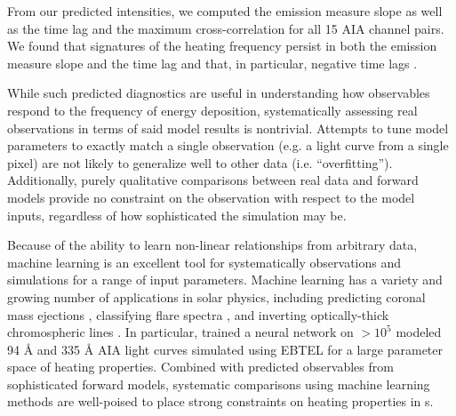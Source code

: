 From our predicted intensities, we computed the emission measure slope as well as the time lag and the maximum cross-correlation for all 15 AIA channel pairs.
We found that signatures of the heating frequency persist in both the emission measure slope and the time lag and that, in particular, negative time lags .

While such predicted diagnostics are useful in understanding how observables respond to the frequency of energy deposition, systematically assessing real observations in terms of said model results is nontrivial.
Attempts to tune model parameters to exactly match a single observation (e.g. a light curve from a single pixel) are not likely to generalize well to other data (i.e. ``overfitting'').
Additionally, purely qualitative comparisons between real data and forward models provide no constraint on the observation with respect to the model inputs, regardless of how sophisticated the simulation may be.

Because of the ability to learn non-linear relationships from arbitrary data, machine learning  is an excellent tool for systematically  observations and simulations for a range of input parameters.
Machine learning has a variety and growing number of applications in solar physics, including predicting coronal mass ejections \citep[e.g.][]{bobra_predicting_2016}, classifying flare spectra \citep{panos_identifying_2018}, and inverting optically-thick chromospheric lines \citep{osborne_radynversion_2019}.
In particular, \citet{tajfirouze_time-resolved_2016} trained a neural network  on $>10^5$ modeled 94 \AA{} and 335 \AA{} AIA light curves simulated using EBTEL for a large parameter space of heating properties.
Combined with predicted observables from sophisticated forward models, systematic comparisons using machine learning methods are well-poised to place strong constraints on heating properties in \AR s.

